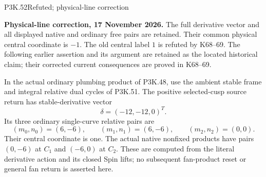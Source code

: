 \begin{statement}{P3K.52}{Refuted; physical-line correction}\par\noindent\textbf{Physical-line correction, 17 November 2026.} The full derivative vector and all displayed native and ordinary free pairs are retained. Their common physical central coordinate is \(-1\). The old central label \(1\) is refuted by K68--69. The following earlier assertion and its argument are retained as the located historical claim; their corrected current consequences are proved in K68--69.\medskip\par 
In the actual ordinary plumbing product of P3K.48, use the ambient
stable frame and integral relative dual cycles of P3K.51. The
positive selected-cusp source return has stable-derivative vector
\[
 \delta=(-12,-12,0)^T.
\]
Its three ordinary single-curve relative pairs are
\[
 (m_0,n_0)=(6,-6),\qquad(m_1,n_1)=(6,-6),\qquad
 (m_2,n_2)=(0,0).
\]
Their central coordinate is one. The actual native nonfixed products
have pairs \((0,-6)\) at \(C_1\) and \((-6,0)\) at \(C_2\).
These are computed from the literal derivative action and its
closed Spin lifts; no subsequent fan-product reset or general fan
return is asserted here.
\end{statement}
